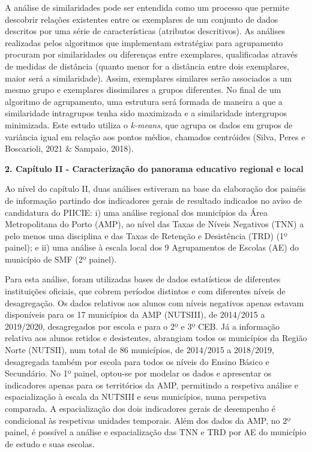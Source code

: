\documentclass[
]{book}
\begin{document}
A análise de similaridades pode ser entendida como um processo que permite descobrir relações existentes entre os exemplares de um conjunto de dados descritos por uma série de características (atributos descritivos). As análises realizadas pelos algoritmos que implementam estratégias para agrupamento procuram por similaridades ou diferenças entre exemplares, qualificadas através de medidas de distância (quanto menor for a distância entre dois exemplares, maior será a similaridade). Assim, exemplares similares serão associados a um mesmo grupo e exemplares dissimilares a grupos diferentes. No final de um algoritmo de agrupamento, uma estrutura será formada de maneira a que a similaridade intragrupos tenha sido maximizada e a similaridade intergrupos minimizada. Este estudo utiliza o \emph{k-means}, que agrupa os dados em grupos de variância igual em relação aos pontos médios, chamados centróides (Silva, Peres e Boscarioli, 2021 \& Sampaio, 2018).

\textbf{2. Capítulo II - Caracterização do panorama educativo regional e local}

Ao nível do capítulo II, duas análises estiveram na base da elaboração dos painéis de informação partindo dos indicadores gerais de resultado indicados no aviso de candidatura do PIICIE: i) uma análise regional dos municípios da Área Metropolitana do Porto (AMP), ao nível das Taxas de Níveis Negativos (TNN) a pelo menos uma disciplina e das Taxas de Retenção e Desistência (TRD) (1º painel); e ii) uma análise à escala local dos 9 Agrupamentos de Escolas (AE) do município de SMF (2º painel).

Para esta análise, foram utilizadas bases de dados estatísticos de diferentes instituições oficiais, que cobrem períodos distintos e com diferentes níveis de desagregação. Os dados relativos aos alunos com níveis negativos apenas estavam disponíveis para os 17 municípios da AMP (NUTSIII), de 2014/2015 a 2019/2020, desagregados por escola e para o 2º e 3º CEB. Já a informação relativa aos alunos retidos e desistentes, abrangiam todos os municípios da Região Norte (NUTSII), num total de 86 municípios, de 2014/2015 a 2018/2019, desagregada também por escola para todos os níveis do Ensino Básico e Secundário. No 1º painel, optou-se por modelar os dados e apresentar os indicadores apenas para os territórios da AMP, permitindo a respetiva análise e espacialização à escala da NUTSIII e seus municípios, numa perspetiva comparada. A espacialização dos dois indicadores gerais de desempenho é condicional às respetivas unidades temporais. Além dos dados da AMP, no 2º painel, é possível a análise e espacialização das TNN e TRD por AE do município de estudo e suas escolas.
\end{document}
